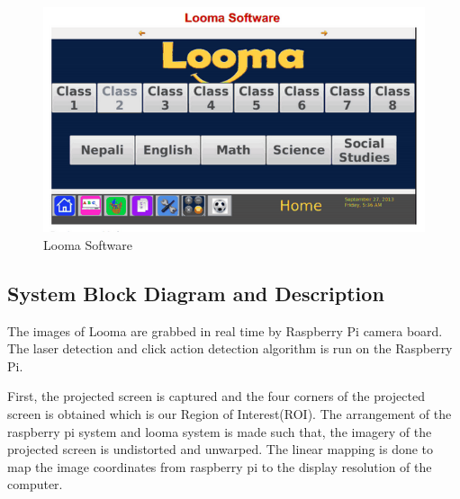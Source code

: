 \documentclass[12pt, a4paper]{article}
\begin{document}
\begin{figure}[htp]
	\centering
		\includegraphics[scale=0.3]{loomasoftware.png}
	\caption{Looma Software}
\label{}
\end{figure}

\subsection{System Block Diagram and Description}

The images of Looma are grabbed in real time by Raspberry Pi camera board. The laser detection and click action detection algorithm is run on the Raspberry Pi.

First, the projected screen is captured and the four corners of the projected screen is obtained which is our Region of Interest(ROI). The arrangement of the raspberry pi system and looma system is made such that, the imagery of the projected screen is undistorted and unwarped. The linear mapping is done to map the image coordinates from raspberry pi to the display resolution of the computer.
\newpage
\end{document}

